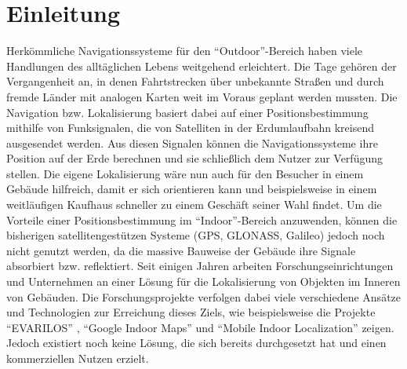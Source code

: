\chapter{Einleitung}
Herkömmliche Navigationssysteme für den "`Outdoor"'-Bereich haben viele Handlungen des alltäglichen Lebens weitgehend erleichtert. Die Tage gehören der Vergangenheit an, in denen Fahrtstrecken über unbekannte Straßen und durch fremde Länder mit analogen Karten weit im Voraus geplant werden mussten. Die Navigation bzw. Lokalisierung basiert dabei auf einer Positionsbestimmung mithilfe von Funksignalen, die von Satelliten in der Erdumlaufbahn kreisend ausgesendet werden. Aus diesen Signalen können die Navigationssysteme ihre Position auf der Erde berechnen und sie schließlich dem Nutzer zur Verfügung stellen. Die eigene Lokalisierung wäre nun auch für den Besucher in einem Gebäude hilfreich, damit er sich orientieren kann und beispielsweise in einem weitläufigen Kaufhaus schneller zu einem Geschäft seiner Wahl findet. Um die Vorteile einer Positionsbestimmung im "`Indoor"'-Bereich anzuwenden, können die bisherigen satellitengestützen Systeme (GPS, GLONASS, Galileo) jedoch noch nicht genutzt werden, da die massive Bauweise der Gebäude ihre Signale absorbiert bzw. reflektiert. Seit einigen Jahren arbeiten Forschungseinrichtungen und Unternehmen an einer Lösung für die Lokalisierung von Objekten im Inneren von Gebäuden. Die Forschungsprojekte verfolgen dabei viele verschiedene Ansätze und Technologien zur Erreichung dieses Ziels, wie beispielsweise die Projekte "`EVARILOS"' \cite{EVA}, "`Google Indoor Maps"' \cite{GIM} und "`Mobile Indoor Localization"' \cite{MIL} zeigen. Jedoch existiert noch keine Lösung, die sich bereits durchgesetzt hat und einen kommerziellen Nutzen erzielt.\\ \\
